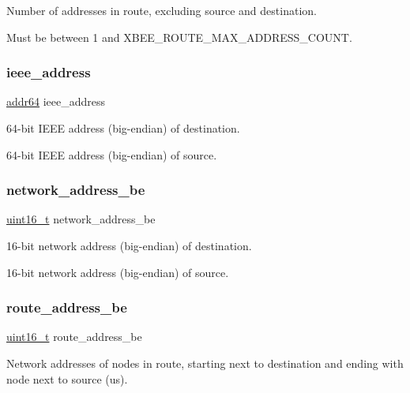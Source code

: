 Number of addresses in route, excluding source and destination. 

Must be between 1 and X\+B\+E\+E\+\_\+\+R\+O\+U\+T\+E\+\_\+\+M\+A\+X\+\_\+\+A\+D\+D\+R\+E\+S\+S\+\_\+\+C\+O\+U\+NT. \mbox{\label{group__xbee__route_ga2549f921e25a72dfa05a2154a792e2bf}} 
\subsubsection{\texorpdfstring{ieee\+\_\+address}{ieee\_address}}
{\footnotesize\ttfamily \hyperlink{unionaddr64}{addr64} ieee\+\_\+address}



64-\/bit I\+E\+EE address (big-\/endian) of destination. 

64-\/bit I\+E\+EE address (big-\/endian) of source. \mbox{\label{group__xbee__route_ga73d48563eb05cd5fcc4add79d226a3b8}} 
\subsubsection{\texorpdfstring{network\+\_\+address\+\_\+be}{network\_address\_be}}
{\footnotesize\ttfamily \hyperlink{group__hal__dos_ga5a8b2dc9e45a9ee81a94ef304fb62505}{uint16\+\_\+t} network\+\_\+address\+\_\+be}



16-\/bit network address (big-\/endian) of destination. 

16-\/bit network address (big-\/endian) of source. \mbox{\label{group__xbee__route_ga943070c7e317d394725c1e65ef4efd04}} 
\subsubsection{\texorpdfstring{route\+\_\+address\+\_\+be}{route\_address\_be}}
{\footnotesize\ttfamily \hyperlink{group__hal__dos_ga5a8b2dc9e45a9ee81a94ef304fb62505}{uint16\+\_\+t} route\+\_\+address\+\_\+be}



Network addresses of nodes in route, starting next to destination and ending with node next to source (us). 

